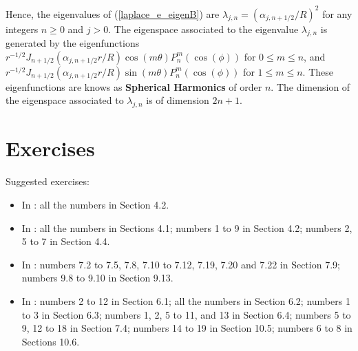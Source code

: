 Hence, the eigenvalues of (\ref{laplace_e_eigenB}) are
$\displaystyle \lambda_{j,n} =
\left(\alpha_{j,n+1/2}/R\right)^2$ for any integers 
$n \geq 0$ and $j > 0$.   The eigenspace associated to the eigenvalue
$\lambda_{j,n}$ is generated by the eigenfunctions
$\displaystyle r^{-1/2} J_{n+1/2}\left(\alpha_{j,n+1/2} r/R\right)
\cos(m\theta)P_n^m(\cos(\phi))$
for $0 \leq m \leq n$, and\\
$\displaystyle r^{-1/2} J_{n+1/2}\left(\alpha_{j,n+1/2} r/R\right)
\sin(m\theta)P_n^m(\cos(\phi))$
for $1 \leq m \leq n$.  These eigenfunctions are knows as
{\bfseries Spherical Harmonics} of
order $n$.  The dimension of the eigenspace associated to
$\lambda_{j,n}$ is of dimension $2n+1$.

\section{Exercises}

Suggested exercises:

\begin{itemize}
\item In \cite{J}: all the numbers in Section 4.2.
\item In \cite{McO}: all the numbers in Sections 4.1; numbers 1 to 9
  in Section 4.2;  numbers 2, 5 to 7 in Section 4.4.
\item In \cite{PinRub}: numbers 7.2 to 7.5, 7.8, 7.10 to 7.12, 7.19,
  7.20 and 7.22 in Section 7.9; numbers 9.8 to 9.10 in Section 9.13. 
\item In \cite{Str}: numbers 2 to 12 in Section 6.1; all the
numbers in Section 6.2; numbers 1 to 3 in Section 6.3; numbers 1, 2, 5
to 11, and 13 in Section 6.4; numbers 5 to 9, 12 to 18 in Section 7.4;
numbers 14 to 19 in Section 10.5; numbers 6 to 8 in Sections 10.6.
\end{itemize}


